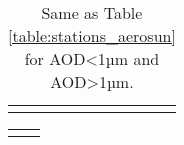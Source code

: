\documentclass[journal abbreviation, manuscript]{copernicus}
\begin{document}
\begin{table}
\begin{tabularx}{\textwidth}{lX}
                                                                                                                                                                                                                                                                                                                                                                                                                                                      \\
  \bottomhline
 \end{tabularx}
 \caption{Same as Table \ref{table:stations_aerosun} for AOD<1µm and AOD>1µm.}
 \label{table:stations_aerosda}
\end{table}

\clearpage

\begin{table}
 \tiny
 \begin{tabularx}{\textwidth}{lX}
  \tophline

\end{tabularx}
\end{table}
\end{document}
